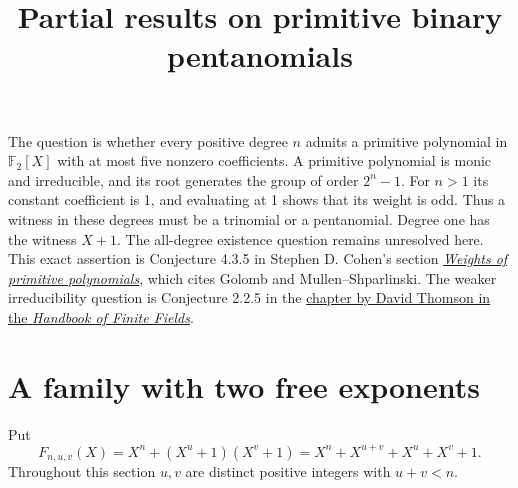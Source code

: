 \documentclass[11pt]{article}
\title{Partial results on primitive binary pentanomials}
\author{}
\date{}
\newcommand{\F}{\mathbb F_2}
\begin{document}
\maketitle
\vspace{-2em}
The question is whether every positive degree \(n\) admits a primitive polynomial
in \(\F[X]\) with at most five nonzero coefficients. A primitive polynomial is
monic and irreducible, and its root generates the group of order \(2^n-1\).
For \(n>1\) its constant coefficient is 1, and evaluating at 1 shows that its
weight is odd. Thus a witness in these degrees must be a trinomial or a
pentanomial. Degree one has the witness \(X+1\). The all-degree existence
question remains unresolved here. This exact assertion is Conjecture 4.3.5
in Stephen D. Cohen's section
\href{https://archive.ymsc.tsinghua.edu.cn/pacm_download/672/12637-dingjt-p2.pdf\#page=133}
{\emph{Weights of primitive polynomials}}, which cites Golomb and
Mullen--Shparlinski. The weaker irreducibility question is Conjecture 2.2.5 in the
\href{https://people.math.carleton.ca/~dthomson/Research/pdfs/DThomson-HFFSect22.pdf}
{chapter by David Thomson in the \emph{Handbook of Finite Fields}}.

\section{A family with two free exponents}
Put
\[
 F_{n,u,v}(X)=X^n+(X^u+1)(X^v+1)
             =X^n+X^{u+v}+X^u+X^v+1 .
\]
Throughout this section \(u,v\) are distinct positive integers with \(u+v<n\).
\end{document}
